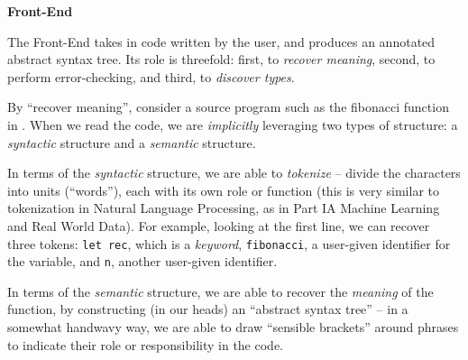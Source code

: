 \begin{minipage}[t]{0.15\textwidth}
    \textbf{\sffamily Front-End}
\end{minipage}%
\begin{minipage}[t]{0.85\textwidth}
    \setlength{\parskip}{.5\baselineskip}
    The Front-End takes in code written by the user, and produces an annotated abstract syntax tree. Its role is threefold: first, to \emph{recover meaning}, second, to perform error-checking, and third, to \emph{discover types}.

    By ``recover meaning'', consider a source program such as the fibonacci function in . When we read the code, we are \emph{implicitly} leveraging two types of structure: a \emph{syntactic} structure and a \emph{semantic} structure.

    In terms of the \emph{syntactic} structure, we are able to \emph{tokenize} -- divide the characters into units (``words''), each with its own role or function (this is very similar to tokenization in Natural Language Processing, as in {\sffamily Part IA Machine Learning and Real World Data}). For example, looking at the first line, we can recover three tokens: \texttt{let rec}, which is a \emph{keyword}, \texttt{fibonacci}, a user-given identifier for the variable, and \texttt{n}, another user-given identifier. 

    In terms of the \emph{semantic} structure, we are able to recover the \emph{meaning} of the function, by constructing (in our heads) an ``abstract syntax tree'' -- in a somewhat handwavy way, we are able to draw ``sensible brackets'' around phrases to indicate their role or responsibility in the code.
\end{minipage}

